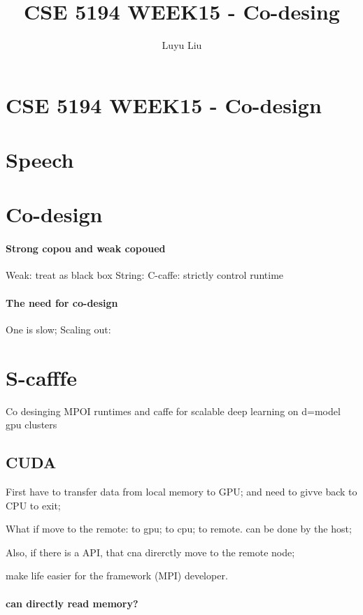 \documentclass[12pt]{article}
\begin{document}
\author{Luyu Liu}

\newcommand\para{\par\refstepcounter{para}\thepara\space}

\section*{CSE 5194 WEEK15 - Co-design}
\title{CSE 5194 WEEK15 - Co-desing}
\section{Speech}

\section{Co-design}
\paragraph{Strong copou and weak copoued}
Weak: treat as black box
String: C-caffe: strictly control runtime

\paragraph{The need for co-design}
One is slow;
Scaling out: 


\section{S-cafffe}
Co desinging MPOI runtimes and caffe for scalable deep learning on d=model gpu clusters

\subsection{CUDA}
First have to transfer data from local memory to GPU;
and need to givve back to CPU to exit;

What if move to the remote: to gpu; to cpu; to remote. can be done by the host;

Also, if there is a API, that cna direrctly move to the remote node;

make life easier for the framework (MPI) developer.

\paragraph{can directly read memory?}
\end{document}
